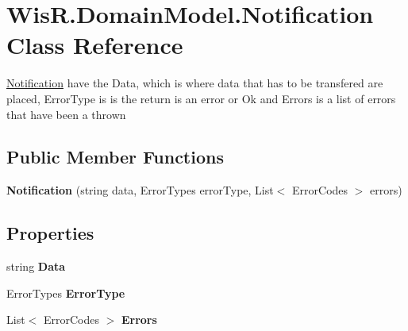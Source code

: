 \hypertarget{class_wis_r_1_1_domain_model_1_1_notification}{}\section{Wis\+R.\+Domain\+Model.\+Notification Class Reference}
\label{class_wis_r_1_1_domain_model_1_1_notification}


\hyperlink{class_wis_r_1_1_domain_model_1_1_notification}{Notification} have the Data, which is where data that has to be transfered are placed, Error\+Type is is the return is an error or Ok and Errors is a list of errors that have been a thrown  


\subsection*{Public Member Functions}
\begin{DoxyCompactItemize}
\item 
\hypertarget{class_wis_r_1_1_domain_model_1_1_notification_aebfa4756b17fc0e4e0e0991a0357524b}{}{\bfseries Notification} (string data, Error\+Types error\+Type, List$<$ Error\+Codes $>$ errors)\label{class_wis_r_1_1_domain_model_1_1_notification_aebfa4756b17fc0e4e0e0991a0357524b}

\end{DoxyCompactItemize}
\subsection*{Properties}
\begin{DoxyCompactItemize}
\item 
\hypertarget{class_wis_r_1_1_domain_model_1_1_notification_ab233e32e8f566789e14472f14ce93462}{}string {\bfseries Data}\label{class_wis_r_1_1_domain_model_1_1_notification_ab233e32e8f566789e14472f14ce93462}

\item 
\hypertarget{class_wis_r_1_1_domain_model_1_1_notification_af357f86dcc63185314c4f99551e987dd}{}Error\+Types {\bfseries Error\+Type}\label{class_wis_r_1_1_domain_model_1_1_notification_af357f86dcc63185314c4f99551e987dd}

\item 
\hypertarget{class_wis_r_1_1_domain_model_1_1_notification_a76e5d12dd501ef145e5c48b540ded547}{}List$<$ Error\+Codes $>$ {\bfseries Errors}\label{class_wis_r_1_1_domain_model_1_1_notification_a76e5d12dd501ef145e5c48b540ded547}

\end{DoxyCompactItemize}


